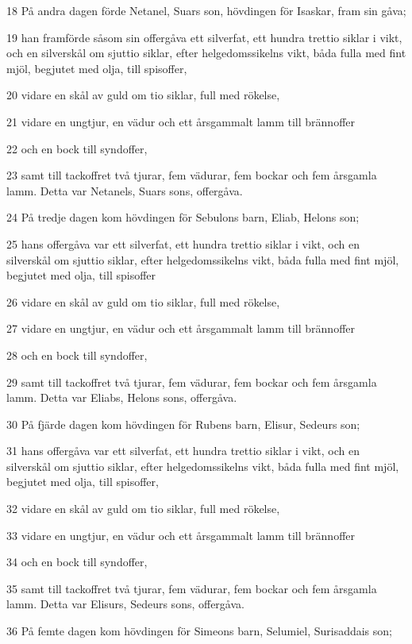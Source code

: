 \par 18 På andra dagen förde Netanel, Suars son, hövdingen för Isaskar, fram sin gåva;
\par 19 han framförde såsom sin offergåva ett silverfat, ett hundra trettio siklar i vikt, och en silverskål om sjuttio siklar, efter helgedomssikelns vikt, båda fulla med fint mjöl, begjutet med olja, till spisoffer,
\par 20 vidare en skål av guld om tio siklar, full med rökelse,
\par 21 vidare en ungtjur, en vädur och ett årsgammalt lamm till brännoffer
\par 22 och en bock till syndoffer,
\par 23 samt till tackoffret två tjurar, fem vädurar, fem bockar och fem årsgamla lamm. Detta var Netanels, Suars sons, offergåva.
\par 24 På tredje dagen kom hövdingen för Sebulons barn, Eliab, Helons son;
\par 25 hans offergåva var ett silverfat, ett hundra trettio siklar i vikt, och en silverskål om sjuttio siklar, efter helgedomssikelns vikt, båda fulla med fint mjöl, begjutet med olja, till spisoffer
\par 26 vidare en skål av guld om tio siklar, full med rökelse,
\par 27 vidare en ungtjur, en vädur och ett årsgammalt lamm till brännoffer
\par 28 och en bock till syndoffer,
\par 29 samt till tackoffret två tjurar, fem vädurar, fem bockar och fem årsgamla lamm. Detta var Eliabs, Helons sons, offergåva.
\par 30 På fjärde dagen kom hövdingen för Rubens barn, Elisur, Sedeurs son;
\par 31 hans offergåva var ett silverfat, ett hundra trettio siklar i vikt, och en silverskål om sjuttio siklar, efter helgedomssikelns vikt, båda fulla med fint mjöl, begjutet med olja, till spisoffer,
\par 32 vidare en skål av guld om tio siklar, full med rökelse,
\par 33 vidare en ungtjur, en vädur och ett årsgammalt lamm till brännoffer
\par 34 och en bock till syndoffer,
\par 35 samt till tackoffret två tjurar, fem vädurar, fem bockar och fem årsgamla lamm. Detta var Elisurs, Sedeurs sons, offergåva.
\par 36 På femte dagen kom hövdingen för Simeons barn, Selumiel, Surisaddais son;
